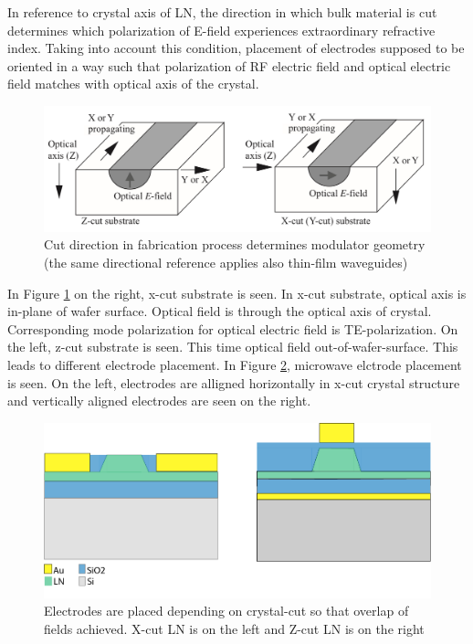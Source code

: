 \documentclass[thesis]{deutez}
\begin{document}
    In reference to crystal axis of LN, the direction in which bulk material is cut determines which polarization of E-field experiences extraordinary refractive index. Taking into account this condition, placement of electrodes supposed to be oriented in a way such that polarization of RF electric field and optical electric field matches with optical axis of the crystal.

    \begin{figure}[h]
        \centering
        \includegraphics[width=0.8\linewidth]{modulator-orientation.jpeg}
        \caption{Cut direction in fabrication process determines modulator geometry\cite{16} (the same directional reference applies also thin-film waveguides)}
        \label{fig:waveguide-orientation}
    \end{figure}
    
    In Figure \ref{fig:waveguide-orientation} on the right, x-cut substrate is seen. In x-cut substrate, optical axis is in-plane of wafer surface. Optical field is through the optical axis of crystal. Corresponding mode polarization for optical electric field is TE-polarization. On the left, z-cut substrate is seen. This time optical field out-of-wafer-surface. This leads to different electrode placement. In Figure \ref{fig:electrode-placement}, microwave elctrode placement is seen. On the left, electrodes are alligned horizontally in x-cut crystal structure and vertically aligned electrodes are seen on the right.

    \begin{figure}
        \centering
        \includegraphics[width=0.9\linewidth]{x-cut-LNOI.png}
        \caption{Electrodes are placed depending on crystal-cut so that overlap of fields achieved. X-cut LN is on the left and Z-cut LN is on the right }
        \label{fig:electrode-placement}
    \end{figure}
 
\end{document}
